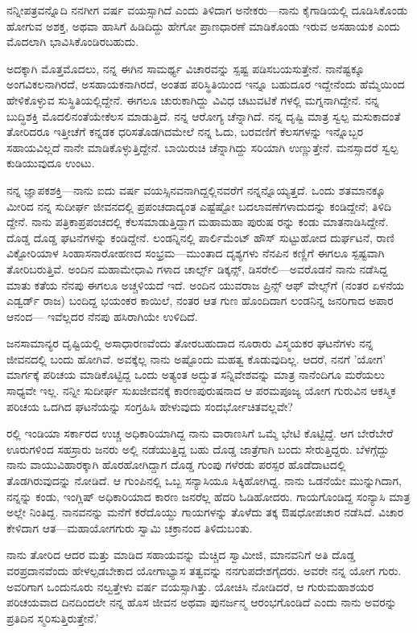 ನನ್ನೀಪತ್ರವನ್ನೊದಿ ನನಗೀಗ  ವರ್ಷ ವಯಸ್ಸಾಗಿದೆ ಎಂದು ತಿಳಿದಾಗ ಅನೇಕರು—ನಾನು ಕೈಗಾಡಿಯಲ್ಲಿ ದೂಡಿಸಿಕೊಂಡು ಹೋಗುವ ಅಶಕ್ತ, ಅಥವಾ ಹಾಸಿಗೆ ಹಿಡಿದಿದ್ದು ಹೇಗೋ ಪ್ರಾಣಧಾರಣೆ ಮಾಡಿಕೊಂಡು ಇರುವ ಅಸಹಾಯಕ ಎಂದು ಮೊದಲಾಗಿ ಭಾವಿಸಿಕೊಂಡಿರಬಹುದು.

ಅದಕ್ಕಾಗಿ ಮೊತ್ತಮೊದಲು, ನನ್ನ ಈಗಿನ ಸಾಮರ್ಥ್ಯ ವಿಚಾರವನ್ನು ಸ್ಪಷ್ಟ ಪಡಿಸಬಯಸುತ್ತೇನೆ. ನಾನೆಷ್ಟಕ್ಕೂ ಅಂಗವಿಕಲನಾಗಿರದೆ, ಅಸಹಾಯಕನಾಗಿರದೆ, ಅಂತಹ ಪರಿಸ್ಥಿತಿಯಿಂದ ಇನ್ನೂ ಬಹುದೂರ ಇದ್ದೇನೆಂದು ಹೆಮ್ಮೆಯಿಂದ ಹೇಳಿಕೊಳ್ಳುವ ಸುಸ್ಥಿತಿಯಲ್ಲಿದ್ದೇನೆ. ಈಗಲೂ ಚುರುಕಾಗಿದ್ದು ವಿವಿಧ ಚಟುವಟಿಕೆ ಗಳಲ್ಲಿ ಮಗ್ನನಾಗಿದ್ದೇನೆ. ನನ್ನ ಬುದ್ಧಿಶಕ್ತಿ ಮೊದಲಿನಂತೆಯೇಕೆಲಸ ಮಾಡುತ್ತಿದೆ. ನನ್ನ ಆರೋಗ್ಯ ಚೆನ್ನಾಗಿದೆ. ನನ್ನ ದೃಷ್ಟಿ ಮಾತ್ರ ಸ್ವಲ್ಪ ಮಸುಕಾದಂತೆ ತೋರಿದರೂ ಇತ್ತೀಚೆಗೆ ಕನ್ನಡಕ ಧರಿಸತೊಡಗಿದಮೇಲೆ ನನ್ನ ಓದು, ಬರವಣಿಗೆ ಕೆಲಸಗಳನ್ನು ಇನ್ನೊಬ್ಬರ ಸಹಾಯವಿಲ್ಲದೆ ನಾನೇ ಮಾಡಿಕೊಳ್ಳುತ್ತಿದ್ದೇನೆ. ಬಾಯಿರುಚಿ ಚೆನ್ನಾಗಿದ್ದು ಸರಿಯಾಗಿ ಉಣ್ಣುತ್ತೇನೆ. ಮನಸ್ಸಾದರೆ ಸ್ವಲ್ಪ ಕುಡಿಯುವುದೂ ಉಂಟು.

ನನ್ನ ಜ್ಞಾಪಕಶಕ್ತಿ—ನಾನು ಐದು ವರ್ಷ ವಯಸ್ಸಿನವನಾಗಿದ್ದಲ್ಲಿನವರೆಗೆ ನನ್ನನ್ನೊಯ್ಯತ್ತದೆ. ಒಂದು ಶತಮಾನಕ್ಕೂ ಮೀರಿದ ನನ್ನ ಸುದೀರ್ಘ ಜೀವನದಲ್ಲಿ ಪ್ರಪಂಚದಾದ್ಯಂತ ಎಷ್ಟೆಷ್ಟೋ ಬದಲಾವಣೆಗಳಾದುದನ್ನು ಕಂಡಿದ್ದೇನೆ; ತಿಳಿದಿ ದ್ದೇನೆ. ನಾನು ಪತ್ರಿಕಾಪ್ರಪಂಚದಲ್ಲಿ ಕೆಲಸಮಾಡುತ್ತಿದ್ದಾಗ ಮಹಾಮಹಾ ಪುರುಷ ರನ್ನು ಕಂಡು ಮಾತನಾಡಿಸಿದ್ದೇನೆ. ದೊಡ್ಡ ದೊಡ್ಡ ಘಟನೆಗಳನ್ನು ಕಂಡಿದ್ದೇನೆ. ಲಂಡನ್ನಿನಲ್ಲಿ ಪಾರ್ಲಿಮೆಂಟ್ ಹೌಸ್ ಸುಟ್ಟುಹೋದ ದುರ್ಘಟನೆ, ರಾಣಿ ವಿಕ್ಟೋರಿಯಾಳ ಸಿಂಹಾಸನಾರೋಹಣದ ಸಂಭ್ರಮ—ಮುಂತಾದ ದೃಶ್ಯಗಳು ನೆನಪಿನ ಕಣ್ಣಿಗೆ ಈಗಲೂ ಸ್ಪಷ್ಟವಾಗಿ ತೋರಿಬರುತ್ತಿವೆ. ಅಂದಿನ ಮಹಾಮೇಧಾವಿ ಗಳಾದ ಚಾರ್ಲ್ಸ್ ಡಿಕ್ಕನ್ಸ್, ಡಿಸರೇಲಿ—ಅವರೊಡನೆ ನಾನು ನಡೆಸಿದ್ದ ಮಾತು ಕತೆಯ ನೆನಪು ಈಗಲೂ ಅಚ್ಚಳಿಯದೆ ಇದೆ. ಅಂದಿನ ಯುವರಾಜ ಪ್ರಿನ್ಸ್ ಆಫ್ ವೇಲ್ಸ್​ಗೆ (ನಂತರ ಏಳನೆಯ ಎಡ್ವರ್ಡ್ ರಾಜ) ಬಂದಿದ್ದ ಭಯಂಕರ ಕಾಯಿಲೆ, ನಂತರ ಆತ ಗುಣ ಹೊಂದಿದಾಗ ಲಂಡನಿನ್ನ ಜನರಿಗಾದ ಅಪಾರ ಆನಂದ— ಇವೆಲ್ಲದರ ನೆನಪು ಹಸಿರಾಗಿಯೇ ಉಳಿದಿದೆ.

ಜನಸಾಮಾನ್ಯರ ದೃಷ್ಟಿಯಲ್ಲಿ ಅಸಾಧಾರಣವೆಂದು ತೋರಬಹುದಾದ ನೂರಾರು ವಿಸ್ಮಯಕರ ಘಟನೆಗಳು ನನ್ನ ಜೀವನದಲ್ಲಿ ಬಂದು ಹೋಗಿವೆ. ಅವಕ್ಕೆಲ್ಲ ನಾನು ಅಷ್ಟೊಂದು ಮಹತ್ವ ಕೊಡುವುದಿಲ್ಲ. ಆದರೆ, ನನಗೆ 'ಯೋಗ' ಮಾರ್ಗಕ್ಕೆ ಪರಿಚಯ ಮಾಡಿಕೊಟ್ಟಿದ್ದ ಒಂದು ಅತ್ಯಂತ ಅದ್ಭುತ ಸನ್ನಿವೇಶವನ್ನು ಮಾತ್ರ ನಾನೆಂದಿಗೂ ಮರೆಯಲು ಸಾಧ್ಯವೇ ಇಲ್ಲ. ನನ್ನೀ ಸುದೀರ್ಘ ಸುಖಜೀವನಕ್ಕೆ ಕಾರಣಪುರುಷನಾದ ಆ ಪರಮಪೂಜ್ಯ ಯೋಗ ಗುರುವಿನ ಆಕಸ್ಮಿಕ ಪರಿಚಯ ಒದಗಿದ ಘಟನೆಯನ್ನು ಸಂಗ್ರಹಿಸಿ ಹೇಳುವುದು ಸಂದರ್ಭೋಚಿತವಲ್ಲವೇ?

 ರಲ್ಲಿ ಇಂಡಿಯಾ ಸರ್ಕಾರದ ಉಚ್ಚ ಅಧಿಕಾರಿಯಾಗಿದ್ದ ನಾನು ವಾರಾಣಸಿಗೆ ಒಮ್ಮೆ ಭೇಟಿ ಕೊಟ್ಟಿದ್ದೆ. ಆಗ ಬೇರೆಬೇರೆ ಊರುಗಳಿಂದ ಸಹಸ್ರಾರು ಜನರು ಅಲ್ಲಿ ನಡೆಯುತ್ತಿದ್ದ ಬಹು ದೊಡ್ಡ ಜಾತ್ರೆಗಾಗಿ ಬಂದು ಸೇರುತ್ತಿದ್ದರು. ಬೆಳಗ್ಗೆದ್ದು ನಾನು ವಾಯುವಿಹಾರಕ್ಕಾಗಿ ಹೊರಹೋಗಿದ್ದಾಗ ದೊಡ್ಡ ಗುಂಪು ಗಳೆರಡು ಪರಸ್ಪರ ಹೊಡೆದಾಟದಲ್ಲಿ ತೊಡಗಿರುವುದನ್ನು ನೋಡಿದೆ. ಆ ಗುಂಪಿನಲ್ಲಿ ಒಬ್ಬ ಸನ್ಯಾಸಿಯೂ ಸಿಕ್ಕಿಹೋಗಿದ್ದ. ನಾನು ಒಡನೆಯೇ ಮುನ್ನುಗಿದಾಗ, ನನ್ನನ್ನು ಕಂಡು, ಇಂಗ್ಲಿಷ್ ಅಧಿಕಾರಿಯಾದ ಕಾರಣ ಜನರೆಲ್ಲ ಹೆದರಿ ಓಡಿಹೋದರು. ಗಾಯಗೊಂಡಿದ್ದ ಸಂನ್ಯಾಸಿ ಮಾತ್ರ ಅಲ್ಲೇ ನಿಂತಿದ್ದ. ನಾನವನನ್ನು ಮನೆಗೆ ಕರೆದೊಯ್ದು ಗಾಯಗಳನ್ನು ತೊಳೆದು ತಕ್ಕ ಔಷಧೋಪಚಾರ ನಡೆಸಿದೆ. ವಿಚಾರ ಕೇಳಿದಾಗ ಆತ—ಮಹಾಯೋಗಗುರು ಸ್ವಾಮಿ ಚಕ್ರಾನಂದ ತಿಳಿದುಬಂತು.

ನಾನು ತೋರಿದ ಆದರ ಮತ್ತು ಮಾಡಿದ ಸಹಾಯವನ್ನು ಮೆಚ್ಚಿದ ಸ್ವಾಮೀಜಿ, ಮಾನವನಿಗೆ ಅತಿ ದೊಡ್ಡ ವರಪ್ರದಾನವೆಂದು ಹೇಳಲ್ಪಡಬೇಕಾದ ಯೋಗಾಭ್ಯಾಸ ತತ್ವವನ್ನು ನನಗುಪದೇಶಗೈದರು. ಅವರೇ ನನ್ನ ಯೋಗ ಗುರು. ಅವರಿಗಾಗ ಒಂದುನೂರು ನಲ್ವತ್ತೇಳು ವರ್ಷ ವಯಸ್ಸಾಗಿತ್ತು. ಯೋಚಿಸಿ ನೋಡಿದರೆ, ಆ ಗುರುಮಹಾಶಯರ ಪರಿಚಯವಾದ ದಿನದಿಂದಲೇ ನನ್ನ ಹೊಸ ಜೀವನ ಅಥವಾ ಪುನರ್ಜನ್ಮ ಆರಂಭಗೊಂಡಿದೆ ಎಂದು ನಾನು ಅವರನ್ನು ಪ್ರತಿದಿನ ಸ್ಮರಿಸುತ್ತಿರುತ್ತೇನೆ.'

\delimiter

